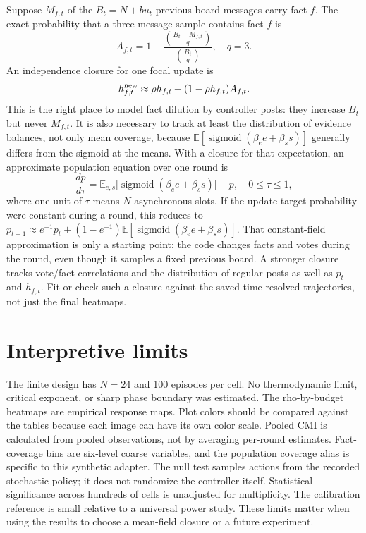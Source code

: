 \documentclass[10pt,a4paper]{article}
\newcommand{\sigm}{\operatorname{sigmoid}}
\begin{document}
Suppose $M_{f,t}$ of the $B_t=N+bu_t$ previous-board messages carry fact $f$.
The exact probability that a three-message sample contains fact $f$ is
\[
A_{f,t}=1-\frac{\binom{B_t-M_{f,t}}{q}}{\binom{B_t}{q}},\quad q=3.
\]
An independence closure for one focal update is
\[
h_{f,t}^{\rm new}\approx \rho h_{f,t}+
  (1-\rho h_{f,t})A_{f,t}.
\]
This is the right place to model fact dilution by controller posts: they
increase $B_t$ but never $M_{f,t}$. It is also necessary to track at least the
distribution of evidence balances, not only mean coverage, because
$\mathbb E[\sigm(\beta_e e+\beta_s s)]$ generally differs from the sigmoid
at the means. With a closure for that expectation, an approximate population
equation over one round is
\[
\frac{dp}{d\tau}=\mathbb E_{e,s}\bigl[\sigm(\beta_e e+\beta_s s)\bigr]-p,
\quad 0\le\tau\le1,
\]
where one unit of $\tau$ means $N$ asynchronous slots. If the update target
probability were constant during a round, this reduces to
$p_{t+1}\approx e^{-1}p_t+(1-e^{-1})\mathbb E[\sigm(\beta_e e+\beta_s s)]$.
That constant-field approximation is only a starting point: the code changes
facts and votes during the round, even though it samples a fixed previous
board. A stronger closure tracks vote/fact correlations and the distribution
of regular posts as well as $p_t$ and $h_{f,t}$. Fit or check such a closure
against the saved time-resolved trajectories, not just the final heatmaps.

\section{Interpretive limits}
The finite design has $N=24$ and 100 episodes per cell. No thermodynamic
limit, critical exponent, or sharp phase boundary was estimated. The
rho-by-budget heatmaps are empirical response maps. Plot colors should be
compared against the tables because each image can have its own color scale.
Pooled CMI is calculated from pooled observations, not by averaging per-round
estimates. Fact-coverage bins are six-level coarse variables, and the
population coverage alias is specific to this synthetic adapter. The null
test samples actions from the recorded stochastic policy; it does not
randomize the controller itself. Statistical significance across hundreds
of cells is unadjusted for multiplicity. The calibration reference is small
relative to a universal power study. These limits matter when using the
results to choose a mean-field closure or a future experiment.
\end{document}
